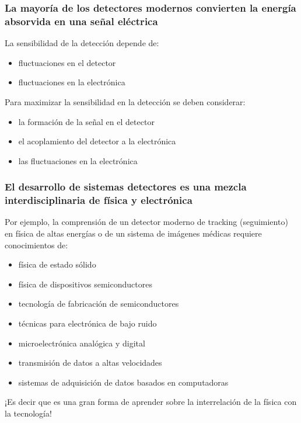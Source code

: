 \documentclass{beamer}
\begin{document}
				\begin{frame}
\frametitle{La mayoría de los detectores modernos convierten la
energía absorvida en una señal eléctrica}
\begin{alertblock}{La sensibilidad de la detección depende de:}
\begin{itemize}
\item fluctuaciones en el detector
\item fluctuaciones en la electrónica
\end{itemize}
\end{alertblock}
\begin{exampleblock}{Para maximizar la sensibilidad en la detección se
deben considerar:}
\begin{itemize}
\item la formación de la señal en el detector
\item el acoplamiento del detector a la electrónica
\item las fluctuaciones en la electrónica
\end{itemize}
\end{exampleblock}
\end{frame}

\begin{frame}
\frametitle{\small{El desarrollo de sistemas detectores es una mezcla interdisciplinaria de física y electrónica}}
{
\small{Por ejemplo, la comprensión de un detector moderno de tracking
(seguimiento) en física de altas energías o de un sistema de imágenes médicas
requiere conocimientos de:}
\begin{itemize}
\item física de estado sólido
\item física de dispositivos semiconductores
\item tecnología de fabricación de semiconductores
\item técnicas para electrónica de bajo ruido
\item microelectrónica analógica y digital
\item transmisión de datos a altas velocidades
\item sistemas de adquisición de datos basados en computadoras
\end{itemize}
}
\begin{exampleblock}{}
\small{¡Es decir que es una gran forma de aprender sobre la interrelación de la
\alert{física} con la \alert{tecnología}!}
\end{exampleblock}
\end{frame}
\end{document}
